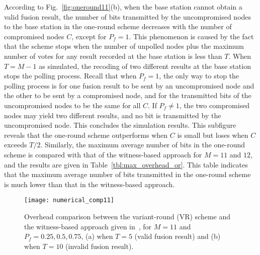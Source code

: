 \documentclass[12pt, onecolumn, draftcls]{IEEEtran}
\begin{document}
According to Fig.~\ref{fig:oneround11}(b), when the base station
cannot obtain a valid fusion result, the number of bits transmitted
by the uncompromised nodes to the base station in the one-round
scheme decreases with the number of compromised nodes $C$, except
for $P_f=1$. This phenomenon is caused by the fact that the scheme
stops when the number of unpolled nodes plus the maximum number of
votes for any result recorded at the base station is less than $T$.
When $T=M-1$ as simulated, the recoding of two different results at
the base station stops the polling process. Recall that when
$P_f=1$, the only way to stop the polling process is for one fusion
result to be sent by an uncompromised node and the other to be sent
by a compromised node, and for the transmitted bits of the
uncompromised nodes to be the same for all $C$. If $P_f\neq 1$, the
two compromised nodes may yield two different results, and no bit is
transmitted by the uncompromised node. This concludes the simulation
results. This subfigure reveals that the one-round scheme
outperforms when $C$ is small but loses when $C$ exceeds $T/2$.
Similarly, the maximum average number of bits in the one-round
scheme is compared with that of the witness-based approach for
$M=11$ and $12$, and the results are given in
Table~\ref{tbl:max_overhead_or}. This table indicates that the
maximum average number of bits transmitted in the one-round scheme
is much lower than that in the witness-based approach.

\begin{table}
\centering
\renewcommand{\arraystretch}{1.3}
\caption{Maximum average overheads (bits) for one-round (OR) scheme
and witness-based approach given
in~\protect\cite{du:assurance}}\centering
{} \label{tbl:max_overhead_or}
\end{table}

\begin{figure}
\centering
\texttt{[image: numerical\_comp11]}
\caption{Overhead comparison between the variant-round (VR) scheme
and the witness-based approach given in~\cite{du:assurance}, for
$M=11$ and $P_f=0.25,0.5,0.75$, (a) when $T=5$ (valid fusion result)
and (b) when $T=10$ (invalid fusion result).}
\label{fig:numerical_comp11}
\end{figure}
\end{document}
